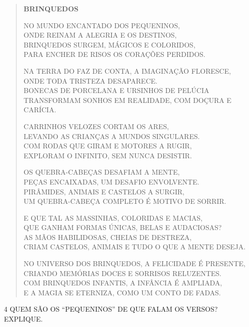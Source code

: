 \begin{myquote}
\begin{verse}
\textbf{BRINQUEDOS}

NO MUNDO ENCANTADO DOS PEQUENINOS,\\
ONDE REINAM A ALEGRIA E OS DESTINOS,\\
BRINQUEDOS SURGEM, MÁGICOS E COLORIDOS,\\
PARA ENCHER DE RISOS OS CORAÇÕES PERDIDOS.


NA TERRA DO FAZ DE CONTA, A IMAGINAÇÃO FLORESCE,\\
ONDE TODA TRISTEZA DESAPARECE.\\
BONECAS DE PORCELANA E URSINHOS DE PELÚCIA\\
TRANSFORMAM SONHOS EM REALIDADE, COM DOÇURA E CARÍCIA.


CARRINHOS VELOZES CORTAM OS ARES,\\
LEVANDO AS CRIANÇAS A MUNDOS SINGULARES.\\
COM RODAS QUE GIRAM E MOTORES A RUGIR,\\
EXPLORAM O INFINITO, SEM NUNCA DESISTIR.


OS QUEBRA-CABEÇAS DESAFIAM A MENTE,\\
PEÇAS ENCAIXADAS, UM DESAFIO ENVOLVENTE.\\
PIRÂMIDES, ANIMAIS E CASTELOS A SURGIR,\\
UM QUEBRA-CABEÇA COMPLETO É MOTIVO DE SORRIR.


E QUE TAL AS MASSINHAS, COLORIDAS E MACIAS,\\
QUE GANHAM FORMAS ÚNICAS, BELAS E AUDACIOSAS?\\
AS MÃOS HABILIDOSAS, CHEIAS DE DESTREZA,\\
CRIAM CASTELOS, ANIMAIS E TUDO O QUE A MENTE DESEJA.


NO UNIVERSO DOS BRINQUEDOS, A FELICIDADE É PRESENTE,\\
CRIANDO MEMÓRIAS DOCES E SORRISOS RELUZENTES.\\
COM BRINQUEDOS INFANTIS, A INFÂNCIA É AMPLIADA,\\
E A MAGIA SE ETERNIZA, COMO UM CONTO DE FADAS.
\end{verse}

\end{myquote}

\num{4} QUEM SÃO OS ``PEQUENINOS'' DE QUE FALAM OS VERSOS? EXPLIQUE.



